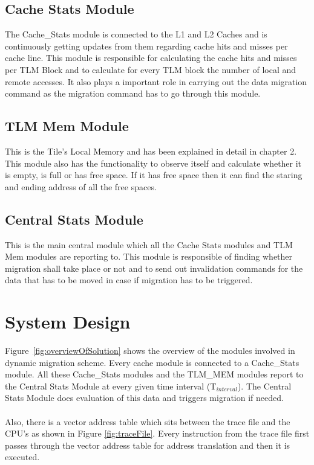 \documentclass{listhesis}
\begin{document}
\subsection{Cache Stats Module}
The Cache{\_}Stats module is connected to the L1 and L2 Caches and is continuously getting updates from them regarding cache hits and misses per cache line. This module is responsible for calculating the cache hits and misses per TLM Block and to calculate for every TLM block the number of local and remote accesses. It also plays a important role in carrying out the data migration command as the migration command has to go through this module. 
\subsection{TLM Mem Module}
This is the Tile's Local Memory and has been explained in detail in chapter 2. This module also has the functionality to observe itself and calculate whether it is empty, is full or has free space. If it has free space then it can find the staring and ending address of all the free spaces. 
\subsection{Central Stats Module}
This is the main central module which all the Cache Stats modules and TLM Mem modules are reporting to. This module is responsible of finding whether migration shall take place or not and to send out invalidation commands for the data that has to be moved in case if migration has to be triggered. 

\section{System Design}
Figure~\ref{fig:overviewOfSolution} shows the overview of the modules involved in dynamic migration scheme. Every cache module is connected to a Cache{\_}Stats module. All these Cache{\_}Stats modules and the TLM{\_}MEM modules report to the Central Stats Module at every given time interval (T$_{interval}$). The Central Stats Module does evaluation of this data and triggers migration if needed. \\
\\
Also, there is a vector address table which sits between the trace file and the CPU's as shown in Figure \ref{fig:traceFile}. Every instruction from the trace file first passes through the vector address table for address translation and then it is executed.
\end{document}
